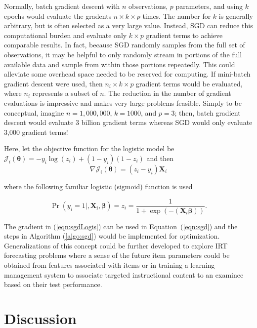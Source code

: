 \documentclass[12pt]{article}
\begin{document}
Normally, batch gradient descent with $n$ observations, $p$ parameters, and using $k$ epochs would evaluate the gradents $n \times k \times p$ times. The number for $k$ is generally arbitrary, but is often selected as a very large value. Instead, SGD can reduce this computational burden and evaluate only $k \times p$ gradient terms to achieve comparable results. In fact, because SGD randomly samples from the full set of observations, it may be helpful to only randomly stream in portions of the full available data and sample from within those portions repeatedly. This could alleviate some overhead space needed to be reserved for computing. If mini-batch gradient descent were used, then $n_i \times k \times p$ gradient terms would be evaluated, where $n_i$ represents a subset of $n$. The reduction in the number of gradient evaluations is impressive and makes very large problems feasible. Simply to be conceptual, imagine $n=1,000,000$, $k=1000$, and $p=3$; then, batch gradient descent would evaluate 3 billion gradient terms whereas SGD would only evaluate 3,000 gradient terms!

Here, let the objective function for the logistic model be $\mathcal{J}_i(\bm{\theta}) = -y_i\log(z_i) + (1 - y_i)(1-z_i)$ and then 
\begin{equation}
\label{eqn:sgdLogis}
\nabla\mathcal{J}_i(\bm{\theta}) = (z_i - y_i)\bm{X}_i
\end{equation}

\noindent where the following familiar logistic (sigmoid) function is used

\begin{equation}
\Pr(y_i=1|,\bm{\bm{X}_i,\beta}) = z_i = \frac{1}{1 + \exp(-(\bm{X}_i\bm{\beta}))}.
\end{equation}

The gradient in (\ref{eqn:sgdLogis}) can be used in Equation~(\ref{eqn:sgd}) and the steps in Algorithm (\ref{algo:sgd}) would be implemented for optimization. Generalizations of this concept could be further developed to explore IRT forecasting problems where a sense of the future item parameters could be obtained from features associated with items or in training a learning management system to associate targeted instructional content to an examinee based on their test performance.   

\section*{Discussion}
\end{document}
